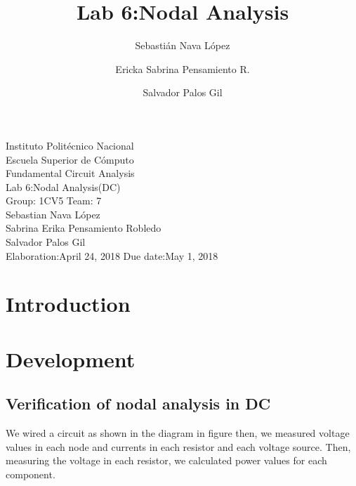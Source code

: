 \documentclass[letterpaper]{article}
\title{Lab 6:Nodal Analysis}
\author{
    Sebastián Nava López\\
    \and
    Ericka Sabrina Pensamiento R.\\
    \and
    Salvador Palos Gil
}
\begin{document}
\begin{titlepage}
    \centering
    {\Huge Instituto Politécnico Nacional}\\[3ex]
    {\huge Escuela Superior de Cómputo}\\[8ex]
    {\huge Fundamental Circuit Analysis}\\[12ex]
    {\Large Lab 6:Nodal Analysis(DC)}\\[20ex]
    {\Large Group: 1CV5 Team: 7 \\[8ex]
    Sebastian Nava López\\[4ex]
    Sabrina Erika Pensamiento Robledo\\[4ex]
    Salvador Palos Gil\\[18ex]
    }
    \large{Elaboration:April 24, 2018 \hspace{8em} Due date:May 1, 2018}
\end{titlepage}
\tableofcontents
\newpage
\section{Introduction}
\newpage
\section{Development}
\subsection{Verification of nodal analysis in DC}
We wired a circuit as shown in the diagram in figure %
then, we measured voltage values in each node and currents in each resistor and each voltage
source. Then, measuring the voltage in each resistor, we calculated power values for each
component.
\end{document}
